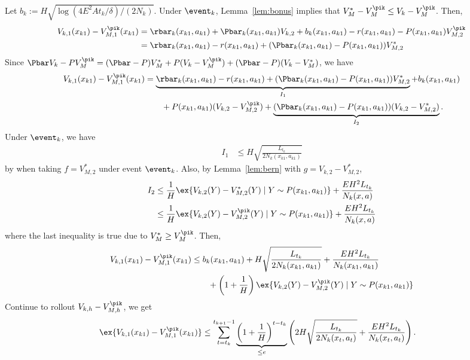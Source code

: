     Let $b_k:=H\sqrt{\log(4E^2At_k/\delta)/(2N_k)}$. Under $\event_k$, Lemma~\ref{lem:bonus} implies that $V_M^*-V_M^{\pik} \le V_{k}-V_M^{\pik}$.
    Then,
    \begin{align*}
    V_{k,1}(x_{k1}) -V_{M,1}^{\pik}(x_{k1})
    &=\rbar_k(x_{k1},a_{k1}) +\Pbar_k(x_{k1},a_{k1})V_{k,2} +b_k(x_{k1},a_{k1}) -r(x_{k1},a_{k1}) -P(x_{k1},a_{k1})V_{M,2}^{\pik} \\
    &=\rbar_k(x_{k1},a_{k1}) -r(x_{k1},a_{k1}) +(\Pbar_k(x_{k1},a_{k1}) -P(x_{k1},a_{k1}))V_{M,2}^*
    \end{align*}
    Since $\Pbar V_k -PV_M^{\pik}=(\Pbar-P)V_M^* +P(V_k-V_M^{\pik}) +(\Pbar-P)(V_k-V_M^*)$, we have
    \begin{align*}
    V_{k,1}(x_{k1}) -V_{M,1}^{\pik}(x_{k1})
    &=\underbrace{\rbar_k(x_{k1},a_{k1}) -r(x_{k1},a_{k1}) +(\Pbar_k(x_{k1},a_{k1}) -P(x_{k1},a_{k1}))V_{M,2}^*}_{I_1} +b_k(x_{k1},a_{k1}) \\
    &\qquad +P(x_{k1},a_{k1})(V_{k,2}-V_{M,2}^{\pik}) +\underbrace{(\Pbar_k(x_{k1},a_{k1})-P(x_{k1},a_{k1}))(V_{k,2}-V_{M,2}^*)}_{I_2}.
    \end{align*}
    Under $\event_k$, we have
    \begin{align*}
    I_1&\le H\sqrt{\frac{L_{t_k}}{2N_k(x_{k1},a_{k1})}}
    \end{align*}
    by when taking $f=V_{M,2}^{*}$ under event $\event_k$.
    Also, by Lemma~\ref{lem:bern} with $g=V_{k,2} -V_{M,2}^{*}$,
    \begin{align*}
    I_2
    &\le\frac1{H}\ex{V_{k,2}(Y) -V_{M,2}^{*}(Y) \mid Y\sim P(x_{k1}, a_{k1})} +\frac{EH^2L_{t_k}}{N_k(x,a)} \\
    &\le\frac1{H}\ex{V_{k,2}(Y) -V_{M,2}^{\pik}(Y) \mid Y\sim P(x_{k1}, a_{k1})} +\frac{EH^2L_{t_k}}{N_k(x,a)}
    \end{align*}
    where the last inequality is true due to $V^*_M\ge V^{\pik}_{M}$.
    Then,
    \begin{align*}
    V_{k,1}(x_{k1}) -V_{M,1}^{\pik}(x_{k1})
    &\le b_k(x_{k1},a_{k1}) +H\sqrt{\frac{L_{t_k}}{2N_k(x_{k1},a_{k1})}} +\frac{EH^2L_{t_k}}{N_k(x_{k1},a_{k1})} \\
    &\qquad +\left(1+\frac1H\right)\ex{V_{k,2}(Y) -V_{M,2}^{\pik}(Y) \mid Y\sim P(x_{k1}, a_{k1})}
    \end{align*}
    Continue to rollout $V_{k,h}-V_{M,h}^{\pik}$, we get
    \begin{align*}
    \ex{V_{k,1}(x_{k1})-V_{M,1}^{\pik}(x_{k1})}
    &\le\sum_{t=t_k}^{t_{k+1}-1}\underbrace{\left(1+\frac1H\right)^{t-t_k}}_{\le e} \left(2H\sqrt{\frac{L_{t_k}}{2N_k(x_t,a_t)}} +\frac{EH^2L_{t_k}}{N_k(x_t,a_t)}\right).
    \end{align*}
